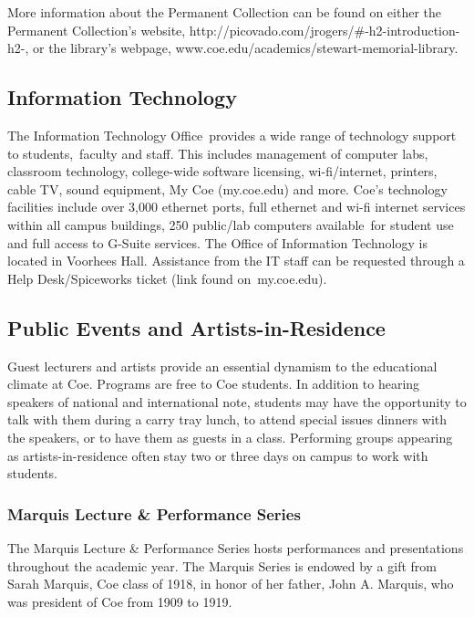 \documentclass[
  letterpaper,
]{scrbook}
\begin{document}
More information about the Permanent Collection can be found on either
the Permanent Collection's website,
http://picovado.com/jrogers/\#-h2-introduction-h2-, or the library's
webpage, www.coe.edu/academics/stewart-memorial-library.

\hypertarget{information-technology}{%
\subsection{Information Technology}\label{information-technology}}

The Information Technology Office~provides a wide range of technology
support to students,~faculty and staff. This includes management of
computer labs, classroom technology, college-wide software licensing,
wi-fi/internet, printers, cable TV, sound equipment, My Coe (my.coe.edu)
and more. Coe's technology facilities include over 3,000 ethernet ports,
full ethernet and wi-fi internet services within all campus buildings,
250 public/lab computers available~for student use and full access to
G-Suite services. The Office of Information Technology is located in
Voorhees Hall. Assistance from the IT staff can be requested through a
Help Desk/Spiceworks ticket (link found on~my.coe.edu).~

\hypertarget{public-events-and-artists-in-residence}{%
\subsection{Public Events and
Artists-in-Residence}\label{public-events-and-artists-in-residence}}

Guest lecturers and artists provide an essential dynamism to the
educational climate at Coe. Programs are free to Coe students. In
addition to hearing speakers of national and international note,
students may have the opportunity to talk with them during a carry tray
lunch, to attend special issues dinners with the speakers, or to have
them as guests in a class. Performing groups appearing as
artists-in-residence often stay two or three days on campus to work with
students.

\hypertarget{marquis-lecture-performance-series}{%
\subsubsection{Marquis Lecture \& Performance
Series}\label{marquis-lecture-performance-series}}

The Marquis Lecture \& Performance Series hosts performances and
presentations throughout the academic year. The Marquis Series is
endowed by a gift from Sarah Marquis, Coe class of 1918, in honor of her
father, John A. Marquis, who was president of Coe from 1909 to 1919.
\end{document}
